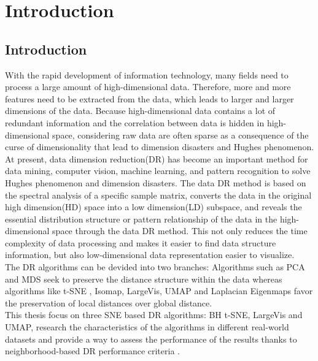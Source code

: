 \part{Introduction} \label{part:how is the conclusion}

\chapter{Introduction}


With the rapid development of information technology, many fields need to process a large amount of high-dimensional data. Therefore, more and more features need to be extracted from the data, which leads to larger and larger dimensions of the data. Because high-dimensional data contains a lot of redundant information and the correlation between data is hidden in high-dimensional space, considering raw data are often sparse as a consequence of the curse of dimensionality that lead to dimension disasters and Hughes phenomenon.\\

\noindent At present, data dimension reduction(DR) has become an important method for data mining, computer vision, machine learning, and pattern recognition to solve Hughes phenomenon and dimension disasters. The data DR method is based on the spectral analysis of a specific sample matrix, converts the data in the original high dimension(HD) space into a low dimension(LD) subspace, and reveals the essential distribution structure or pattern relationship of the data in the high-dimensional space through the data DR method. This not only reduces the time complexity of data processing and makes it easier to find data structure information, but also low-dimensional data representation easier to visualize.\\


\noindent The DR algorithms can be devided into two branches: Algorithms such as PCA and MDS seek to preserve the distance structure within the data whereas algorithms like t-SNE , Isomap, LargeVis, UMAP and Laplacian Eigenmaps favor the preservation of local distances over global distance.\\

\noindent This thesis focus on three SNE based DR algorithms: BH t-SNE, LargeVis and UMAP, research the characteristics of the algorithms in different real-world datasets and provide a way to assess the performance of the results thanks to neighborhood-based DR performance criteria \cite{ref4}.


